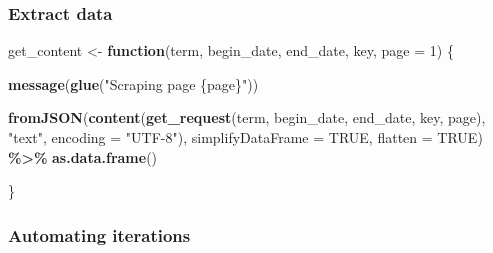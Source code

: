 \documentclass[
]{book}
\newenvironment{Shaded}{\begin{snugshade}}{\end{snugshade}}
\newcommand{\AttributeTok}[1]{\textcolor[rgb]{0.13,0.29,0.53}{#1}}
\newcommand{\ConstantTok}[1]{\textcolor[rgb]{0.56,0.35,0.01}{#1}}
\newcommand{\ControlFlowTok}[1]{\textcolor[rgb]{0.13,0.29,0.53}{\textbf{#1}}}
\newcommand{\DecValTok}[1]{\textcolor[rgb]{0.00,0.00,0.81}{#1}}
\newcommand{\FunctionTok}[1]{\textcolor[rgb]{0.13,0.29,0.53}{\textbf{#1}}}
\newcommand{\NormalTok}[1]{#1}
\newcommand{\OtherTok}[1]{\textcolor[rgb]{0.56,0.35,0.01}{#1}}
\newcommand{\SpecialCharTok}[1]{\textcolor[rgb]{0.81,0.36,0.00}{\textbf{#1}}}
\newcommand{\StringTok}[1]{\textcolor[rgb]{0.31,0.60,0.02}{#1}}
\begin{document}
\subsubsection{Extract data}\label{extract-data}

\begin{Shaded}
\begin{Highlighting}[]
\NormalTok{get\_content }\OtherTok{\textless{}{-}} \ControlFlowTok{function}\NormalTok{(term, begin\_date, end\_date, key, }\AttributeTok{page =} \DecValTok{1}\NormalTok{) \{}

    \FunctionTok{message}\NormalTok{(}\FunctionTok{glue}\NormalTok{(}\StringTok{"Scraping page \{page\}"}\NormalTok{))}

    \FunctionTok{fromJSON}\NormalTok{(}\FunctionTok{content}\NormalTok{(}\FunctionTok{get\_request}\NormalTok{(term, begin\_date, end\_date, key, page),}
                     \StringTok{"text"}\NormalTok{,}
                \AttributeTok{encoding =} \StringTok{"UTF{-}8"}\NormalTok{),}
                \AttributeTok{simplifyDataFrame =} \ConstantTok{TRUE}\NormalTok{, }\AttributeTok{flatten =} \ConstantTok{TRUE}\NormalTok{) }\SpecialCharTok{\%\textgreater{}\%} \FunctionTok{as.data.frame}\NormalTok{()}

\NormalTok{\}}
\end{Highlighting}
\end{Shaded}

\subsubsection{Automating iterations}\label{automating-iterations}
\end{document}
